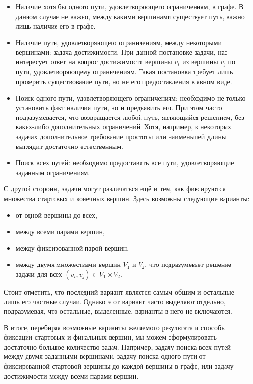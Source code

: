 \begin{itemize}
\item Наличие хотя бы одного пути, удовлетворяющего ограничениям, в графе. В данном случае не важно, между какими вершинами существует путь, важно лишь наличие его в графе.

\item Наличие пути, удовлетворяющего ограничениям, между некоторыми вершинами: задача достижимости.
      При данной постановке задачи, нас интересует ответ на вопрос достижимости вершины $v_i$ из вершины $v_j$ по пути, удовлетворяющему ограничениям.
      Такая постановка требует лишь проверить существование пути, но не его предоставления в явном виде.

\item Поиск одного пути, удовлетворяющего ограничениям: необходимо не только установить факт наличия пути, но и  предъявить его. При этом часто подразумевается, что возвращается любой путь, являющийся решением, без каких-либо дополнительных ограничений. Хотя, например, в некоторых задачах дополнительное требование простоты или наименьшей длины выглядит достаточно естественным.

\item Поиск всех путей: необходимо предоставить все пути, удовлетворяющие заданным ограничениям.
\end{itemize}

С другой стороны, задачи могут различаться ещё и тем, как фиксируются множества стартовых и конечных вершин.
Здесь возможны следующие варианты:
\begin{itemize}
\item от одной вершины до всех,
\item между всеми парами вершин,
\item между фиксированной парой вершин,
\item между двумя множествами вершин $V_1$ и $V_2$, что подразумевает решение задачи для всех $(v_i,v_j) \in V_1 \times V_2$.
\end{itemize}

Стоит отметить, что последний вариант является самым общим и остальные --- лишь его частные случаи.
Однако этот вариант часто выделяют отдельно, подразумевая, что остальные, выделенные, варианты в него не включаются.

В итоге, перебирая возможные варианты желаемого результата и способы фиксации стартовых и финальных вершин, мы можем сформулировать достаточно большое количество задач. Например, задачу поиска всех путей между двумя заданными вершинами, задачу поиска одного пути от фиксированной стартовой вершины до каждой вершины в графе, или задачу достижимости между всеми парами вершин.

